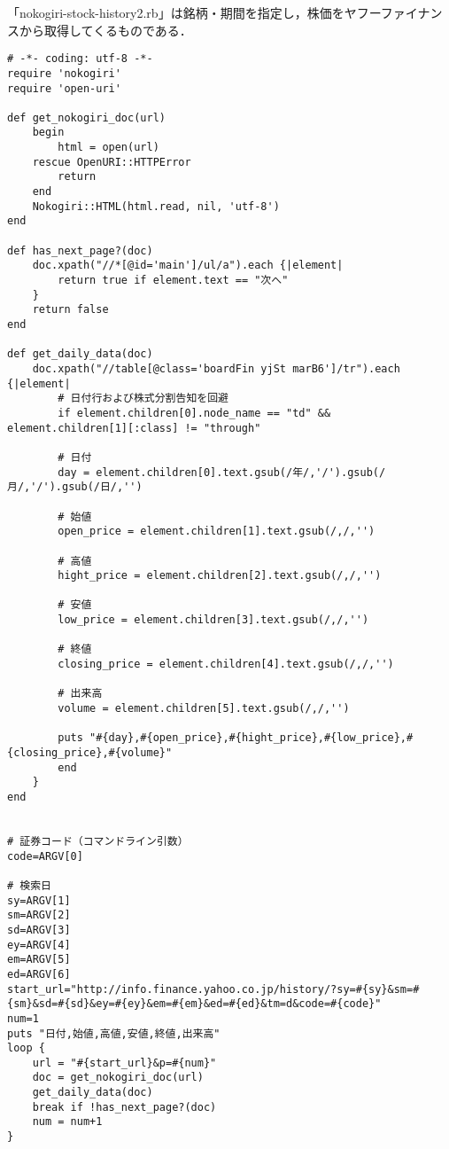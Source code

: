「nokogiri-stock-history2.rb」は銘柄・期間を指定し，株価をヤフーファイナンスから取得してくるものである．
\begin{lstlisting}
# -*- coding: utf-8 -*-
require 'nokogiri'
require 'open-uri'

def get_nokogiri_doc(url)
	begin
		html = open(url)
	rescue OpenURI::HTTPError
		return
	end
	Nokogiri::HTML(html.read, nil, 'utf-8')
end

def has_next_page?(doc)
	doc.xpath("//*[@id='main']/ul/a").each {|element|
		return true if element.text == "次へ"
	}
	return false
end

def get_daily_data(doc)
	doc.xpath("//table[@class='boardFin yjSt marB6']/tr").each {|element|
		# 日付行および株式分割告知を回避
		if element.children[0].node_name == "td" && element.children[1][:class] != "through"

		# 日付
		day = element.children[0].text.gsub(/年/,'/').gsub(/月/,'/').gsub(/日/,'')

		# 始値
		open_price = element.children[1].text.gsub(/,/,'')

		# 高値
		hight_price = element.children[2].text.gsub(/,/,'')

		# 安値
		low_price = element.children[3].text.gsub(/,/,'')

		# 終値
		closing_price = element.children[4].text.gsub(/,/,'')

		# 出来高
		volume = element.children[5].text.gsub(/,/,'')

		puts "#{day},#{open_price},#{hight_price},#{low_price},#{closing_price},#{volume}"
		end
	}
end


# 証券コード（コマンドライン引数）
code=ARGV[0]

# 検索日
sy=ARGV[1]
sm=ARGV[2]
sd=ARGV[3]
ey=ARGV[4]
em=ARGV[5]
ed=ARGV[6]
start_url="http://info.finance.yahoo.co.jp/history/?sy=#{sy}&sm=#{sm}&sd=#{sd}&ey=#{ey}&em=#{em}&ed=#{ed}&tm=d&code=#{code}"
num=1
puts "日付,始値,高値,安値,終値,出来高"
loop {
	url = "#{start_url}&p=#{num}"
	doc = get_nokogiri_doc(url)
	get_daily_data(doc)
	break if !has_next_page?(doc)
	num = num+1
}

\end{lstlisting}

